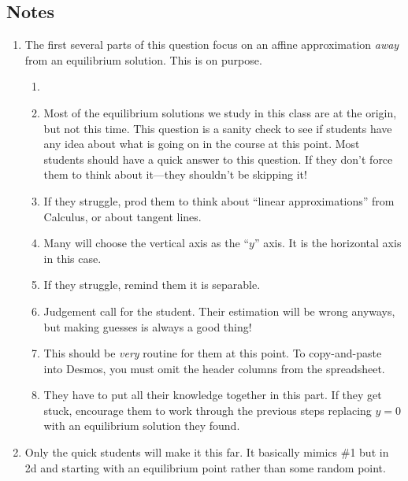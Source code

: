 \subsection*{Notes}
\begin{enumerate}
	\item The first several parts of this question focus on an affine approximation \emph{away} from an equilibrium solution.
	      This is on purpose.
	      \begin{enumerate}
		      \item
		      \item Most of the equilibrium solutions we study in this class are at the origin, but not this time. This question
		            is a sanity check to see if students have any idea about what is going on in the course at this point. Most students
		            should have a quick answer to this question. If they don't force them to think about it---they shouldn't be skipping it!
		      \item If they struggle, prod them to think about ``linear approximations'' from Calculus, or about tangent lines.
		      \item Many will choose the vertical axis as the ``$y$'' axis. It is the horizontal axis in this case.
		      \item If they struggle, remind them it is separable.
		      \item Judgement call for the student. Their estimation will be wrong anyways, but making guesses is always a good thing!
		      \item This should be \emph{very} routine for them at this point. To copy-and-paste into Desmos, you must omit the header
		            columns from the spreadsheet.
		      \item They have to put all their knowledge together in this part. If they get stuck, encourage them to work through the
		            previous steps replacing $y=0$ with an equilibrium solution they found.

	      \end{enumerate}
	\item Only the quick students will make it this far. It basically mimics \#1 but in 2d and starting with an equilibrium point
	      rather than some random point.
\end{enumerate}